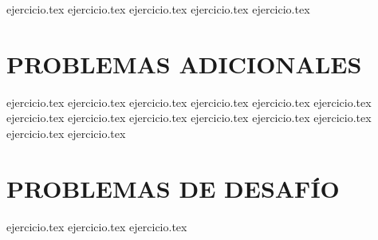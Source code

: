 \begin{enumerate}
    \setcounter{enumi}{24}
    {ejercicio.tex}
    {ejercicio.tex}
    {ejercicio.tex}
    {ejercicio.tex}
    {ejercicio.tex}
\end{enumerate}

\section*{PROBLEMAS ADICIONALES}
\begin{enumerate}
    \setcounter{enumi}{29}
    {ejercicio.tex}
    {ejercicio.tex}
    {ejercicio.tex}
    {ejercicio.tex}
    {ejercicio.tex}
    {ejercicio.tex}
    {ejercicio.tex}
    {ejercicio.tex}
    {ejercicio.tex}
    {ejercicio.tex}
    {ejercicio.tex}
    {ejercicio.tex}
    {ejercicio.tex}
    {ejercicio.tex}
\end{enumerate}

\section*{PROBLEMAS DE DESAFÍO}
\begin{enumerate}
    \setcounter{enumi}{43}
    {ejercicio.tex}
    {ejercicio.tex}
    {ejercicio.tex}
\end{enumerate}
